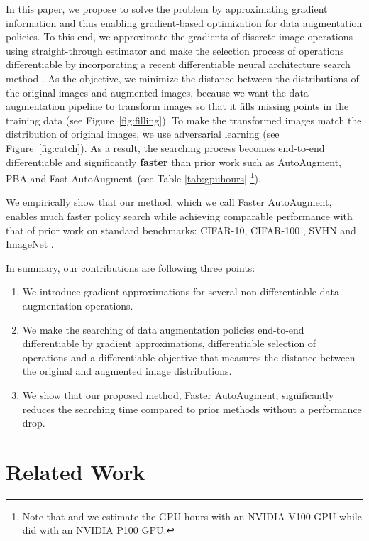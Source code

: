 \documentclass[10pt,twocolumn,letterpaper]{article}
\def\Figref#1{Figure~\ref{#1}}
\newcommand{\Tabref}[1]{Table \ref{#1}}
\newcommand{\autoaugment}{AutoAugment\xspace}
\newcommand{\faster}{Faster \autoaugment}
\newcommand{\fast}{Fast \autoaugment}
\begin{document}
In this paper, we propose to solve the problem by approximating gradient information and thus enabling gradient-based optimization for data augmentation policies. To this end, we approximate the gradients of discrete image operations using straight-through estimator \cite{Bengio2013} and make the selection process of operations differentiable by incorporating a recent differentiable neural architecture search method \cite{Liu2018c}. As the objective, we minimize the distance between the distributions of the original images and augmented images, because we want the data augmentation pipeline to transform images so that it fills missing points in the training data \cite{Lim2019} (see \Figref{fig:filling}). To make the transformed images match the distribution of original images, we use adversarial learning (see \Figref{fig:catch}). As a result, the searching process becomes end-to-end differentiable and significantly \textbf{faster} than prior work such as \autoaugment, PBA and \fast ~(see \Tabref{tab:gpuhours} \footnote{Note that \cite{Lim2019} and we estimate the GPU hours with an NVIDIA V100 GPU while \cite{Cubuk2018} did with an NVIDIA P100 GPU.}).

We empirically show that our method, which we call \faster, enables much faster policy search while achieving comparable performance with that of prior work on standard benchmarks: CIFAR-10, CIFAR-100 \cite{Krizhevsky2009}, SVHN \cite{Netzer2011} and ImageNet \cite{Russakovsky2015}.

In summary, our contributions are following three points:

\begin{enumerate}
    \item We introduce gradient approximations for several non-differentiable data augmentation operations.
    \item We make the searching of data augmentation policies end-to-end differentiable by gradient approximations, differentiable selection of operations and a differentiable objective that measures the distance between the original and augmented image distributions.
    \item We show that our proposed method, \faster, significantly reduces the searching time compared to prior methods without a performance drop.
\end{enumerate}


\section{Related Work}
\end{document}
